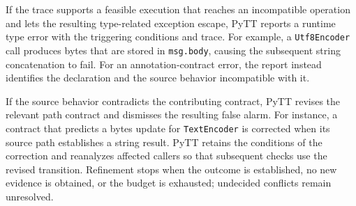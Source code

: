 If the trace supports a feasible execution that reaches an incompatible
operation and lets the resulting type-related exception escape, PyTT
reports a runtime type error with the triggering conditions and trace.
For example, a \texttt{Utf8Encoder} call produces bytes that are stored
in \texttt{msg.body}, causing the subsequent string concatenation to
fail. For an annotation-contract error, the report instead identifies
the declaration and the source behavior incompatible with it.

If the source behavior contradicts the contributing contract, PyTT
revises the relevant path contract and dismisses the resulting false
alarm. For instance, a contract that predicts a bytes update for
\texttt{TextEncoder} is corrected when its source path establishes a
string result. PyTT retains the conditions of the correction and
reanalyzes affected callers so that subsequent checks use the revised
transition. Refinement stops when the outcome is established, no new
evidence is obtained, or the budget is exhausted; undecided conflicts
remain unresolved.

